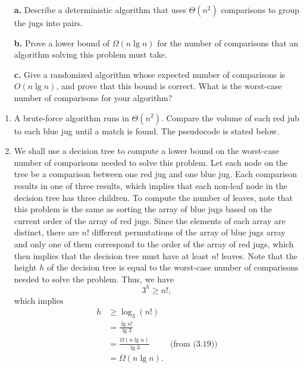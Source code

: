\begin{enumerate}
{\begin{itemize}
\item[\textbf{a.}]{Describe a deterministic algorithm that uses $\Theta(n^2)$
comparisons to group the jugs into pairs.}
\item[\textbf{b.}]{Prove a lower bound of $\Omega(n \lg n)$ for the number of
comparisons that an algorithm solving this problem must take.}
\item[\textbf{c.}]{Give a randomized algorithm whose expected number of
comparisons is $O(n \lg n)$, and prove that this bound is correct. What is the
worst-case number of comparisons for your algorithm?}
\end{itemize}
}

\begin{framed}
\begin{enumerate}
\item A brute-force algorithm runs in $\Theta(n^2)$. Compare the volume of each
red jub to each blue jug until a match is found. The pseudocode is stated below.

\begin{algorithm}[H]
\SetAlgoNoEnd\DontPrintSemicolon
\BlankLine
{}
\nonl{}
\end{algorithm}

\item We shall use a decision tree to compute a lower bound on the worst-case
number of comparisons needed to solve this problem. Let each node on the tree be
a comparison between one red jug and one blue jug. Each comparison results in
one of three results, which implies that each non-leaf node in the decision tree
has three children. To compute the number of leaves, note that this problem is
the same as sorting the array of blue jugs based on the current order of the
array of red jugs. Since the elements of each array are distinct, there are $n!$
different permutations of the array of blue jugs array and only one of them
correspond to the order of the array of red jugs, which then implies that the
decision tree must have at least $n!$ leaves. Note that the height $h$ of the
decision tree is equal to the worst-case number of comparisons needed to solve
the problem. Thus, we have
\[
  3^h \ge n!,
\]
which implies
\begin{equation*}
\begin{aligned}
  h &\ge \log_3 (n!)\\
    &=   \frac{\lg n!}{\lg 3}\\
    &=   \frac{\Omega(n \lg n)}{\lg 3} & \text{(from (3.19))}\\
    &=   \Omega(n \lg n).
\end{aligned}
\end{equation*}


\end{enumerate}
\end{framed}
\end{enumerate}
